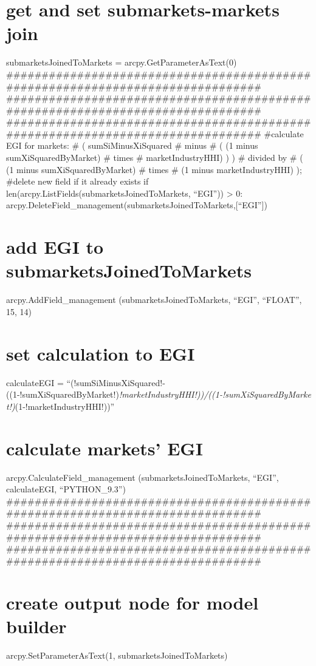 \documentclass[]{article}
\begin{document}
\section{get and set submarkets-markets
join}\label{get-and-set-submarkets-markets-join}

submarketsJoinedToMarkets = arcpy.GetParameterAsText(0)
\#\#\#\#\#\#\#\#\#\#\#\#\#\#\#\#\#\#\#\#\#\#\#\#\#\#\#\#\#\#\#\#\#\#\#\#\#\#\#\#\#\#\#\#\#\#\#\#\#\#\#\#\#\#\#\#\#\#\#\#\#\#\#\#\#\#\#\#\#\#\#\#\#\#\#\#\#\#\#
\#\#\#\#\#\#\#\#\#\#\#\#\#\#\#\#\#\#\#\#\#\#\#\#\#\#\#\#\#\#\#\#\#\#\#\#\#\#\#\#\#\#\#\#\#\#\#\#\#\#\#\#\#\#\#\#\#\#\#\#\#\#\#\#\#\#\#\#\#\#\#\#\#\#\#\#\#\#\#
\#\#\#\#\#\#\#\#\#\#\#\#\#\#\#\#\#\#\#\#\#\#\#\#\#\#\#\#\#\#\#\#\#\#\#\#\#\#\#\#\#\#\#\#\#\#\#\#\#\#\#\#\#\#\#\#\#\#\#\#\#\#\#\#\#\#\#\#\#\#\#\#\#\#\#\#\#\#\#
\#calculate EGI for markets: \# ( sumSiMinusXiSquared \# minus \# ( (1
minus sumXiSquaredByMarket) \# times \# marketIndustryHHI) ) ) \#
divided by \# ( (1 minus sumXiSquaredByMarket) \# times \# (1 minus
marketIndustryHHI) ); \#delete new field if it already exists if
len(arcpy.ListFields(submarketsJoinedToMarkets, ``EGI'')) \textgreater{}
0:
arcpy.DeleteField\_management(submarketsJoinedToMarkets,{[}``EGI''{]})

\section{add EGI to
submarketsJoinedToMarkets}\label{add-egi-to-submarketsjoinedtomarkets}

arcpy.AddField\_management (submarketsJoinedToMarkets, ``EGI'',
``FLOAT'', 15, 14)

\section{set calculation to EGI}\label{set-calculation-to-egi}

calculateEGI =
``(!sumSiMinusXiSquared!-((1-!sumXiSquaredByMarket!)\emph{!marketIndustryHHI!))/((1-!sumXiSquaredByMarket!)}(1-!marketIndustryHHI!))''

\section{calculate markets' EGI}\label{calculate-markets-egi}

arcpy.CalculateField\_management (submarketsJoinedToMarkets, ``EGI'',
calculateEGI, ``PYTHON\_9.3'')
\#\#\#\#\#\#\#\#\#\#\#\#\#\#\#\#\#\#\#\#\#\#\#\#\#\#\#\#\#\#\#\#\#\#\#\#\#\#\#\#\#\#\#\#\#\#\#\#\#\#\#\#\#\#\#\#\#\#\#\#\#\#\#\#\#\#\#\#\#\#\#\#\#\#\#\#\#\#\#
\#\#\#\#\#\#\#\#\#\#\#\#\#\#\#\#\#\#\#\#\#\#\#\#\#\#\#\#\#\#\#\#\#\#\#\#\#\#\#\#\#\#\#\#\#\#\#\#\#\#\#\#\#\#\#\#\#\#\#\#\#\#\#\#\#\#\#\#\#\#\#\#\#\#\#\#\#\#\#
\#\#\#\#\#\#\#\#\#\#\#\#\#\#\#\#\#\#\#\#\#\#\#\#\#\#\#\#\#\#\#\#\#\#\#\#\#\#\#\#\#\#\#\#\#\#\#\#\#\#\#\#\#\#\#\#\#\#\#\#\#\#\#\#\#\#\#\#\#\#\#\#\#\#\#\#\#\#\#

\section{create output node for model
builder}\label{create-output-node-for-model-builder}

arcpy.SetParameterAsText(1, submarketsJoinedToMarkets)
\end{document}
